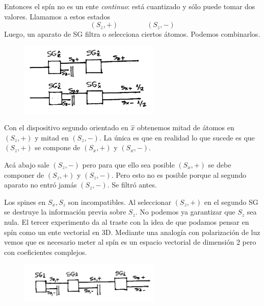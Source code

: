 \documentclass[10pt,oneside]{CBFT_book}
\begin{document}
Entonces el spín no es un ente {\it continuo}: está cuantizado y sólo puede tomar dos valores.
Llamamos a estos estados
\[
	(S_z,+) \qquad \qquad (S_z,-)
\]
Luego, un aparato de SG filtra o selecciona ciertos átomos. Podemos combinarlos.

\begin{figure}[htb]
	\begin{center}
	\includegraphics[width=0.6\textwidth]{images/teo2_3.pdf}	 
	\end{center}
	\caption{}
\end{figure} 

Con el dispositivo segundo orientado en $\hat{x}$ obtenemos mitad de átomos en
$(S_z,+)$ y mitad en $(S_z,-)$. La única es que en realidad lo que sucede es que 
$(S_z,+)$ se compone de $(S_x,+)$ y $(S_x,-)$.

Acá abajo sale $(S_z,-)$ pero para que ello sea posible 
$(S_x,+)$ se debe componer de $(S_z,+)$ y $(S_z,-)$. Pero esto no es posible
porque al segundo aparato no entró jamás $(S_z,-)$. Se filtró antes.

Los spines en $S_x, S_z$ son incompatibles. Al seleccionar $(S_z,+)$ en el segundo
SG se destruye la información previa sobre $S_z$. No podemos ya garantizar que $S_z$
sea nula.
El tercer experimento da al traste con la idea de que podamos pensar en spín como un
ente vectorial en 3D. Mediante una analogía con polarización de luz vemos que es necesario
meter al spín es un espacio vectorial de dimensión 2 pero con coeficientes complejos.

\begin{figure}[htb]
	\begin{center}
	\includegraphics[width=0.6\textwidth]{images/teo2_4.pdf}	 
	\end{center}
	\caption{}
\end{figure} 
\end{document}
